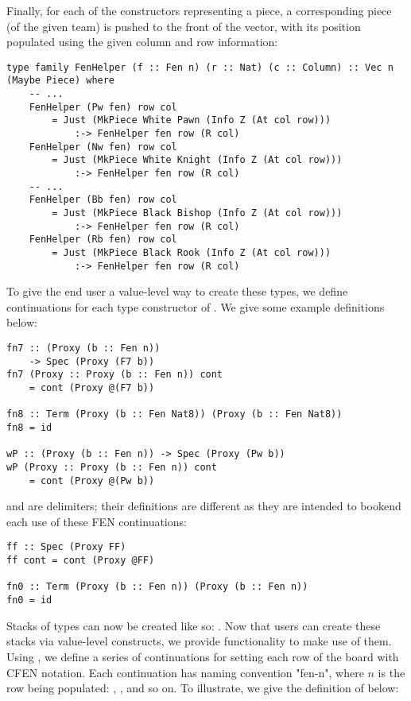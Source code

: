 Finally, for each of the constructors representing a piece, a corresponding piece (of the given team) is pushed to the front of the vector, with its position populated using the given column and row information:

\begin{lstlisting}
type family FenHelper (f :: Fen n) (r :: Nat) (c :: Column) :: Vec n (Maybe Piece) where
    -- ...
    FenHelper (Pw fen) row col
        = Just (MkPiece White Pawn (Info Z (At col row)))
            :-> FenHelper fen row (R col)
    FenHelper (Nw fen) row col
        = Just (MkPiece White Knight (Info Z (At col row)))
            :-> FenHelper fen row (R col)
    -- ...
    FenHelper (Bb fen) row col
        = Just (MkPiece Black Bishop (Info Z (At col row)))
            :-> FenHelper fen row (R col)
    FenHelper (Rb fen) row col
        = Just (MkPiece Black Rook (Info Z (At col row)))
            :-> FenHelper fen row (R col)
\end{lstlisting}

To give the end user a value-level way to create these  types, we define continuations for each type constructor of . We give some example definitions below:

\begin{lstlisting}
fn7 :: (Proxy (b :: Fen n))
    -> Spec (Proxy (F7 b))
fn7 (Proxy :: Proxy (b :: Fen n)) cont
    = cont (Proxy @(F7 b))

fn8 :: Term (Proxy (b :: Fen Nat8)) (Proxy (b :: Fen Nat8))
fn8 = id

wP :: (Proxy (b :: Fen n)) -> Spec (Proxy (Pw b))
wP (Proxy :: Proxy (b :: Fen n)) cont
    = cont (Proxy @(Pw b))
\end{lstlisting}

 and  are delimiters; their definitions are different as they are intended to bookend each use of these FEN continuations:

\begin{lstlisting}
ff :: Spec (Proxy FF)
ff cont = cont (Proxy @FF)

fn0 :: Term (Proxy (b :: Fen n)) (Proxy (b :: Fen n))
fn0 = id
\end{lstlisting}

Stacks of  types can now be created like so: . Now that users can create these stacks via value-level constructs, we provide functionality to make use of them. Using , we define a series of continuations for setting each row of the board with CFEN notation. Each continuation has naming convention "fen-n", where $n$ is the row being populated: , , and so on. To illustrate, we give the definition of  below:

